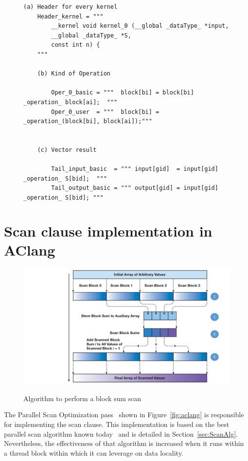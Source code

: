 \documentclass[Ingles]{ic-tese-v1}
\newcommand{\rsec}[1]{Section~\ref{sec:#1}}
\newcommand{\rfig}[1]{Figure~\ref{fig:#1}}
\begin{document}
\begin{figure}[t]
	\lstset{basicstyle=\scriptsize}
	\begin{lstlisting}[label=lst:TemplateScan, caption={Template to generate the final kernel of scan parallel algorithm}, escapeinside={}]
	(a) Header for every kernel
	Header_kernel = """
		__kernel void kernel_0 (__global _dataType_ *input,
		__global _dataType_ *S,
		const int n) {
	"""

	(b) Kind of Operation

		Oper_0_basic = """	block[bi] = block[bi] _operation_ block[ai];  """
		Oper_0_user  = """	block[bi] = _operation_(block[bi], block[ai]);"""


	(c) Vector result

		Tail_input_basic  = """	input[gid]  = input[gid] _operation_ S[bid];  """
		Tail_output_basic = """ output[gid] = input[gid] _operation_ S[bid]; """

	\end{lstlisting}
\end{figure}


\section{Scan clause implementation in AClang}
\label{sec:ScanInAClang}

\begin{figure}[t]
	\centering
	\caption{Algorithm to perform a block sum scan}
	\includegraphics[scale=0.45]{images/phaseScan.pdf}
	\label{fig:scheme}
\end{figure}


The Parallel Scan Optimization  pass~ shown in \rfig{aclang}
is responsible  for implementing the scan  clause. This implementation
is    based   on    the   best    parallel   scan    algorithm   known
today~\cite{Sengupta:2007}       and       is       detailed       in
\rsec{ScanAlg}.  Nevertheless, the  effectiveness  of  that algorithm  is
increased  when it  runs within  a thread  block within  which it  can
leverage on data locality.
\end{document}
